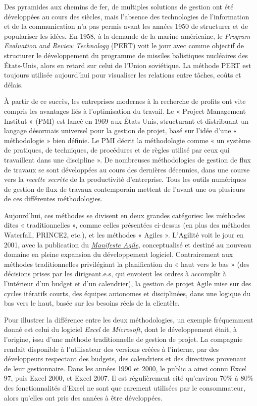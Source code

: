 \documentclass[
  letterpaper,
  DIV=11,
  numbers=noendperiod]{scrreprt}
\begin{document}
Des pyramides aux chemins de fer, de multiples solutions de gestion ont
été développées au cours des siècles, mais l'absence des technologies de
l'information et de la communication n'a pas permis avant les années
1950 de structurer et de populariser les idées. En 1958, à la demande de
la marine américaine, le \emph{Program Evaluation and Review Technology}
(PERT) voit le jour avec comme objectif de structurer le développement
du programme de missiles balistiques nucléaires des États-Unis, alors en
retard sur celui de l'Union soviétique. La méthode PERT est toujours
utilisée aujourd'hui pour visualiser les relations entre tâches, coûts
et délais.

À partir de ce succès, les entreprises modernes à la recherche de
profits ont vite compris les avantages liés à l'optimisation du travail.
Le « Project Management Institut » (PMI) est lancé en 1969 aux
États-Unis, structurant et distribuant un langage désormais universel
pour la gestion de projet, basé sur l'idée d'une « méthodologie » bien
définie. Le PMI décrit la méthodologie comme « un système de pratiques,
de techniques, de procédures et de règles utilisé par ceux qui
travaillent dans une discipline ». De nombreuses méthodologies de
gestion de flux de travaux se sont développées au cours des dernières
décennies, dans une course vers la \emph{recette secrète} de la
productivité d'entreprise. Tous les outils numériques de gestion de flux
de travaux contemporain mettent de l'avant une ou plusieurs de ces
différentes méthodologies.

Aujourd'hui, ces méthodes se divisent en deux grandes catégories: les
méthodes dites « traditionnelles », comme celles présentées ci-dessus
(en plus des méthodes Waterfall, PRINCE2, etc.), et les méthodes «
Agiles ». L'Agilité voit le jour en 2001, avec la publication du
\href{https://agilemanifesto.org/iso/fr/manifesto.html}{\emph{Manifeste
Agile}}, conceptualisé et destiné au nouveau domaine en pleine expansion
du développement logiciel. Contrairement aux méthodes traditionnelles
privilégiant la planification du « haut vers le bas » (des décisions
prises par les dirigeant.e.s, qui envoient les ordres à accomplir à
l'intérieur d'un budget et d'un calendrier), la gestion de projet Agile
mise sur des cycles itératifs courts, des équipes autonomes et
disciplinées, dans une logique du bas vers le haut, basée sur les
besoins réels de la clientèle.

Pour illustrer la différence entre les deux méthodologies, un exemple
fréquemment donné est celui du logiciel \emph{Excel} de
\emph{Microsoft}, dont le développement était, à l'origine, issu d'une
méthode traditionnelle de gestion de projet. La compagnie rendait
disponible à l'utilisateur des versions créées à l'interne, par des
développeurs respectant des budgets, des calendriers et des directives
provenant de leur gestionnaire. Dans les années 1990 et 2000, le public
a ainsi connu Excel 97, puis Excel 2000, et Excel 2007. Il est
régulièrement cité qu'environ 70\% à 80\% des fonctionnalités d'Excel ne
sont que rarement utilisées par le consommateur, alors qu'elles ont pris
des années à être développées.
\end{document}
